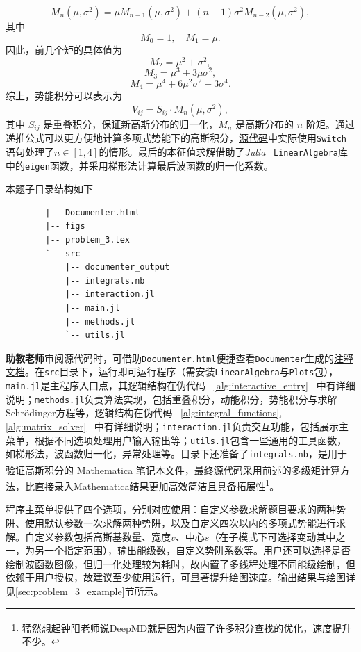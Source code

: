 \[
M_n(\mu, \sigma^2) = \mu M_{n-1}(\mu, \sigma^2) + (n-1) \sigma^2 M_{n-2}(\mu, \sigma^2),
\]
其中
\[
M_0 = 1, \quad M_1 = \mu.
\]
因此，前几个矩的具体值为
\[
M_2 = \mu^2 + \sigma^2,
\]
\[
M_3 = \mu^3 + 3 \mu \sigma^2,
\]
\[
M_4 = \mu^4 + 6 \mu^2 \sigma^2 + 3 \sigma^4.
\]
综上，势能积分可以表示为
\[
V_{ij} = S_{ij} \cdot M_n(\mu, \sigma^2),
\]
其中 $S_{ij}$ 是重叠积分，保证新高斯分布的归一化，$M_n$ 是高斯分布的 $n$ 阶矩。通过递推公式可以更方便地计算多项式势能下的高斯积分，\href{https://github.com/bud-primordium/Computational-Physics-Fall-2024/blob/main/Assignment_3/Problem_3/src/methods.jl#L106-L117}{源代码}中实际使用\texttt{Switch}语句处理了$n\in [1,4]$的情形。最后的本征值求解借助了\textit{Julia} \ \texttt{LinearAlgebra}库中的\texttt{eigen}函数，并采用梯形法计算最后波函数的归一化系数。

本题子目录结构如下
\begin{multicols}{2}
	\begin{verbatim}
        |-- Documenter.html
        |-- figs
        |-- problem_3.tex
        `-- src
            |-- documenter_output
            |-- integrals.nb
            |-- interaction.jl
            |-- main.jl
            |-- methods.jl
            `-- utils.jl
    \end{verbatim}
\end{multicols}
\noindent \textbf{助教老师}审阅源代码时，可借助\texttt{Documenter.html}便捷查看\texttt{Documenter}生成的\href{https://bud-primordium.github.io/Computational-Physics-Fall-2024/Assignment_3/Problem_3/src/documenter_output/build/index.html}{注释文档}。在\texttt{src}目录下，运行即可运行程序（需安装\texttt{LinearAlgebra}与\texttt{Plots}包），\texttt{main.jl}是主程序入口点，其逻辑结构在伪代码 \ \ref{alg:interactive_entry} \ 中有详细说明；\texttt{methods.jl}负责算法实现，包括重叠积分，动能积分，势能积分与求解Schrödinger方程等，逻辑结构在伪代码 \ \ref{alg:integral_functions},\ref{alg:matrix_solver} \ 中有详细说明；\texttt{interaction.jl}负责交互功能，包括展示主菜单，根据不同选项处理用户输入输出等；\texttt{utils.jl}包含一些通用的工具函数，如梯形法，波函数归一化，异常处理等。目录下还准备了\texttt{integrals.nb}，是用于验证高斯积分的 Mathematica\textsuperscript{\textregistered} 笔记本文件，最终源代码采用前述的多级矩计算方法，比直接录入Mathematica\textsuperscript{\textregistered}结果更加高效简洁且具备拓展性\footnote{猛然想起钟阳老师说DeepMD\textsuperscript{\textregistered}就是因为内置了许多积分查找的优化，速度提升不少。}。

程序主菜单提供了四个选项，分别对应使用：自定义参数求解题目要求的两种势阱、使用默认参数一次求解两种势阱，以及自定义四次以内的多项式势能进行求解。自定义参数包括高斯基数量、宽度$v$、中心$s$（在子模式下可选择变动其中之一，为另一个指定范围），输出能级数，自定义势阱系数等。用户还可以选择是否绘制波函数图像，但归一化处理较为耗时，故内置了多线程处理不同能级绘制，但依赖于用户授权，故建议至少使用运行，可显著提升绘图速度。输出结果与绘图详见\ref{sec:problem_3_example}节所示。

